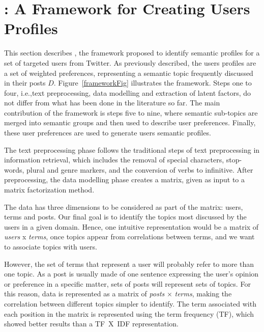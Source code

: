 \section{\method: A Framework for Creating Users Profiles }

This section describes \method, the framework proposed to identify semantic
profiles for a set of targeted users from Twitter. As previously described,
the users profiles are a set of weighted preferences, representing a semantic
topic frequently discussed in their posts $D$.  Figure~\ref{frameworkFig}
illustrates the framework.  Steps one to four, i.e.,text
preprocessing, data modelling and extraction of latent factors, do not differ
from what has been done in the literature so far. The main contribution of the
framework is steps five to nine, where semantic sub-topics are merged into
semantic groups and then used to describe user preferences. Finally, these
user preferences are used to generate users semantic profiles.

The text preprocessing phase follows the traditional steps of text
preprocessing in information retrieval, which includes the removal of special
characters, stop-words, plural and genre
markers, and the conversion of verbs to infinitive.  After preprocessing, the
data modelling phase creates a matrix, given as input to a matrix
factorization method.

The data has three dimensions to be considered as part of the matrix: users,
terms and posts. Our final goal is to identify the topics most discussed by
the users in a given domain. Hence, one intuitive representation would be a
matrix of \textit{users} x \textit{terms}, once topics appear from
correlations between terms, and we want to associate topics with users.

However, the set of terms that represent a user will probably refer to more than one topic. As a post is usually made of one sentence expressing the user's opinion or preference in a specific matter, sets of posts will represent sets of topics. For this reason, data is represented as a matrix of \textit{posts} $\times$ \textit{terms}, making the correlation between different topics simpler to identify.
The term associated with each position in the matrix is represented using the term frequency (TF), which showed better results than a TF~X~IDF representation. 

